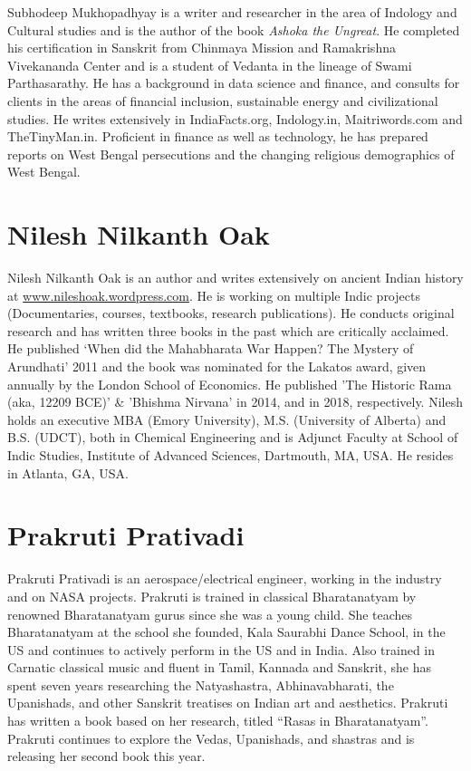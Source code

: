 Subhodeep Mukhopadhyay is a writer and researcher in the area of Indology and Cultural studies and is the author of the book \textit{Ashoka the Ungreat}. He completed his certification in Sanskrit from Chinmaya Mission and Ramakrishna Vivekananda Center and is a student of Vedanta in the lineage of Swami Parthasarathy. He has a background in data science and finance, and consults for clients in the areas of financial inclusion, sustainable energy and civilizational studies. He writes extensively in IndiaFacts.org, Indology.in, Maitriwords.com and TheTinyMan.in. Proficient in finance as well as technology, he has prepared reports on West Bengal persecutions and the changing religious demographics of West Bengal. 

\section*{Nilesh Nilkanth Oak}

Nilesh Nilkanth Oak is an author and writes extensively on ancient Indian history at \url{www.nileshoak.wordpress.com}. He is working on multiple Indic projects (Documentaries, courses, textbooks, research publications). He conducts original research and has written three books in the past which are critically acclaimed. He published ‘When did the Mahabharata War Happen? The Mystery of Arundhati’ 2011 and the book was nominated for the Lakatos award, given annually by the London School of Economics. He published 'The Historic Rama (aka, 12209 BCE)' \& 'Bhishma Nirvana' in 2014, and in 2018, respectively. Nilesh holds an executive MBA (Emory University), M.S. (University of Alberta) and B.S. (UDCT), both in Chemical Engineering and is Adjunct Faculty at School of Indic Studies, Institute of Advanced Sciences, Dartmouth, MA, USA. He resides in Atlanta, GA, USA.

\section*{Prakruti Prativadi}

Prakruti Prativadi is an aerospace/electrical engineer, working in the industry and on NASA projects. Prakruti is trained in classical Bharatanatyam by renowned Bharatanatyam gurus since she was a young child. She teaches Bharatanatyam at the school she founded, Kala Saurabhi Dance School, in the US and continues to actively perform in the US and in India. Also trained in Carnatic classical music and fluent in Tamil, Kannada and Sanskrit, she has spent seven years researching the Natyashastra, Abhinavabharati, the Upanishads, and other Sanskrit treatises on Indian art and aesthetics. Prakruti has written a book based on her research, titled “Rasas in Bharatanatyam”. Prakruti continues to explore the Vedas, Upanishads, and shastras and is releasing her second book this year.


